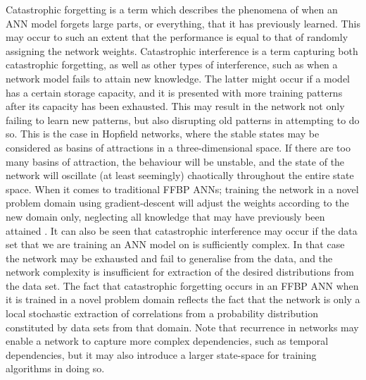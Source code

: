 Catastrophic forgetting \citep{McCloskey1989, Ratcliff1990} is a term which describes the phenomena of when an ANN model forgets large parts, or everything, that it has previously learned. This may occur to such an extent that the performance is equal to that of randomly assigning the network weights. Catastrophic interference is a term capturing both catastrophic forgetting, as well as other types of interference, such as when a network model fails to attain new knowledge. The latter might occur if a model has a certain storage capacity, and it is presented with more training patterns after its capacity has been exhausted. This may result in the network not only failing to learn new patterns, but also disrupting old patterns in attempting to do so. This is the case in Hopfield networks, where the stable states may be considered as basins of attractions in a three-dimensional space. If there are too many basins of attraction, the behaviour will be unstable, and the state of the network will oscillate (at least seemingly) chaotically throughout the entire state space.
When it comes to traditional FFBP ANNs; training the network in a novel problem domain using gradient-descent will adjust the weights according to the new domain only, neglecting all knowledge that may have previously been attained \citep{McCloskey1989, French1999, French2001}.
It can also be seen that catastrophic interference may occur if the data set that we are training an ANN model on is sufficiently complex. In that case the network may be exhausted and fail to generalise from the data, and the network complexity is insufficient for extraction of the desired distributions from the data set. 
The fact that catastrophic forgetting occurs in an FFBP ANN when it is trained in a novel problem domain reflects the fact that the network is only a local stochastic extraction of correlations from a probability distribution constituted by data sets from that domain. Note that recurrence in networks may enable a network to capture more complex dependencies, such as temporal dependencies, but it may also introduce a larger state-space for training algorithms in doing so.
\\

